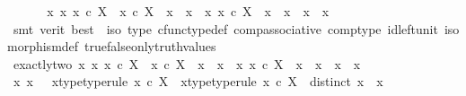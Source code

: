 \begin{isabellebody}
\ \ \isamarkupfalse%
\ \isamarkupfalse%
\ \ {\isachardoublequoteopen}{\isasymexists}x{}\ x{}{\isachardot}{\kern0pt}\ x{}\ {\isasymin}\isactrlsub c\ X\ {\isasymand}\ x{}\ {\isasymin}\isactrlsub c\ X\ {\isasymand}\ x{}\ {\isasymnoteq}\ x{}\ {\isasymand}\ {\isacharparenleft}{\kern0pt}{\isasymforall}x{\isachardot}{\kern0pt}\ x\ {\isasymin}\isactrlsub c\ X\ {\isasymlongrightarrow}\ x\ {\isacharequal}{\kern0pt}\ x{}\ {\isasymor}\ x\ {\isacharequal}{\kern0pt}\ x{}{\isacharparenright}{\kern0pt}{\isachardoublequoteclose}\isanewline
\ \ \ \ \isamarkupfalse%
\ {\isacharparenleft}{\kern0pt}smt\ {\isacharparenleft}{\kern0pt}verit{\isacharcomma}{\kern0pt}\ best{\isacharparenright}{\kern0pt}\ \ {\isasymphi}{\isacharunderscore}{\kern0pt}iso\ {\isasymphi}{\isacharunderscore}{\kern0pt}type\ cfunc{\isacharunderscore}{\kern0pt}type{\isacharunderscore}{\kern0pt}def\ comp{\isacharunderscore}{\kern0pt}associative{}\ comp{\isacharunderscore}{\kern0pt}type\ id{\isacharunderscore}{\kern0pt}left{\isacharunderscore}{\kern0pt}unit{}\ isomorphism{\isacharunderscore}{\kern0pt}def\ true{\isacharunderscore}{\kern0pt}false{\isacharunderscore}{\kern0pt}only{\isacharunderscore}{\kern0pt}truth{\isacharunderscore}{\kern0pt}values{\isacharparenright}{\kern0pt}\isanewline
{}\isamarkupfalse%
\isanewline
\ \ \isamarkupfalse%
\ exactly{\isacharunderscore}{\kern0pt}two{\isacharcolon}{\kern0pt}\ {\isachardoublequoteopen}{\isasymexists}x{}\ x{}{\isachardot}{\kern0pt}\ x{}\ {\isasymin}\isactrlsub c\ X\ {\isasymand}\ x{}\ {\isasymin}\isactrlsub c\ X\ {\isasymand}\ x{}\ {\isasymnoteq}\ x{}\ {\isasymand}\ {\isacharparenleft}{\kern0pt}{\isasymforall}x{\isachardot}{\kern0pt}\ x\ {\isasymin}\isactrlsub c\ X\ {\isasymlongrightarrow}\ x\ {\isacharequal}{\kern0pt}\ x{}\ {\isasymor}\ x\ {\isacharequal}{\kern0pt}\ x{}{\isacharparenright}{\kern0pt}{\isachardoublequoteclose}\isanewline
\ \ \isamarkupfalse%
\ \isamarkupfalse%
\ x{}\ x{}\ \ \ x{}{\isacharunderscore}{\kern0pt}type{\isacharbrackleft}{\kern0pt}type{\isacharunderscore}{\kern0pt}rule{\isacharbrackright}{\kern0pt}{\isacharcolon}{\kern0pt}\ {\isachardoublequoteopen}x{}\ {\isasymin}\isactrlsub c\ X{\isachardoublequoteclose}\ \ x{}{\isacharunderscore}{\kern0pt}type{\isacharbrackleft}{\kern0pt}type{\isacharunderscore}{\kern0pt}rule{\isacharbrackright}{\kern0pt}{\isacharcolon}{\kern0pt}\ {\isachardoublequoteopen}x{}\ {\isasymin}\isactrlsub c\ X{\isachardoublequoteclose}\ \ distinct{\isacharcolon}{\kern0pt}\ {\isachardoublequoteopen}x{}\ {\isasymnoteq}\ x{}{\isachardoublequoteclose}\isanewline

\end{isabellebody}
